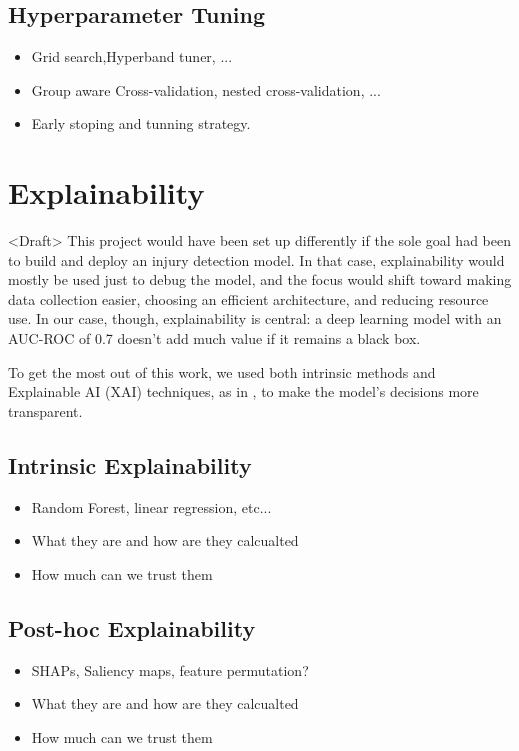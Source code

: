 \subsection{Hyperparameter Tuning}\label{subsec:method-hyperparameter-tuning}

\begin{itemize}
    \item Grid search,Hyperband tuner, ...
    \item Group aware Cross-validation, nested cross-validation, ...
    \item Early stoping and tunning strategy.
\end{itemize}


\section{Explainability}\label{sec:method-explainability}
<Draft> This project would have been set up differently if the sole goal had been to build and deploy an injury detection model. In that case, explainability would mostly be used just to debug the model, and the focus would shift toward making data collection easier, choosing an efficient architecture, and reducing resource use. In our case, though, explainability is central: a deep learning model with an AUC-ROC of 0.7 doesn't add much value if it remains a black box.

To get the most out of this work, we used both intrinsic methods and Explainable AI (XAI) techniques, as in \cite{FuentesJimnez2025}, to make the model's decisions more transparent.

\subsection{Intrinsic Explainability}\label{subsec:method-intrinsic-explainability}
\begin{itemize}
    \item Random Forest, linear regression, etc...
    \item What they are and how are they calcualted
    \item How much can we trust them
\end{itemize}

\subsection{Post-hoc Explainability}\label{subsec:method-posthoc-explainability}
\begin{itemize}
    \item SHAPs, Saliency maps, feature permutation?
    \item What they are and how are they calcualted
    \item How much can we trust them
\end{itemize}

